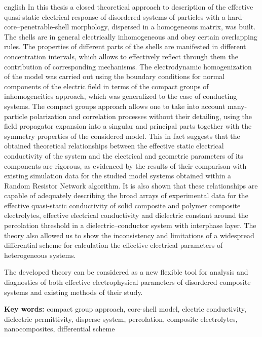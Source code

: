 \begin{otherlanguage*}{english}
In this thesis a closed theoretical approach to description of the effective quasi-static electrical response of disordered systems of particles with a hard-core--penetrable-shell morphology, dispersed in a homogeneous matrix, was built. The shells are in general electrically inhomogeneous and obey certain overlapping rules. The properties of different parts of the shells are  manifested in different concentration intervals, which allows to effectively reflect through them the contribution of corresponding mechanisms. The electrodynamic homogenization of the model was carried out using the boundary conditions for normal components of the electric field in terms of the compact groups of inhomogeneities approach, which was generalized to the case of conducting systems. The compact groups approach allows one to take into account many-particle polarization and correlation processes without their detailing, using the field propagator expansion into a singular and principal parts together with the symmetry properties of the considered model. This in fact suggests that the obtained theoretical relationships between the effective static electrical conductivity of the system and the electrical and geometric parameters of its components are rigorous, as evidenced by the results of their comparison with existing simulation data for the studied model systems obtained within a Random Resistor Network algorithm. It is also shown that these relationships are capable of adequately describing the broad arrays of experimental data for the effective quasi-static conductivity of solid composite and polymer composite electrolytes, effective electrical conductivity and dielectric constant around the percolation threshold in a dielectric--conductor system with interphase layer. The theory also allowed us to show the inconsistency and limitations of a widespread differential scheme for calculation the effective electrical parameters of heterogeneous systems.

The developed theory can be considered as a new flexible tool for analysis and diagnostics of both effective electrophysical parameters of disordered composite systems and existing methods of their study.


\vskip 15pt
\textbf{Key words:} compact group approach, core-shell model, electric conductivity, dielectric permittivity, disperse system, percolation, composite electrolytes, nanocomposites, differential scheme

\end{otherlanguage*}